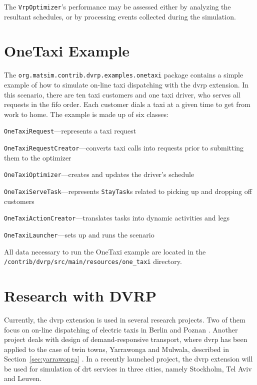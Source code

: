 The \lstinline$VrpOptimizer$'s performance may be assessed either by analyzing the resultant schedules, or by processing events collected during the simulation.

\section{OneTaxi Example}
The \lstinline$org.matsim.contrib.dvrp.examples.onetaxi$ package contains a simple example of how to simulate on-line taxi dispatching with the \gls{dvrp} extension. In this scenario, there are ten taxi customers and one taxi driver, who serves all requests in the \gls{fifo} order. Each customer dials a taxi at a given time to get from work to home. The example is made up of six classes:
%
\begin{compactitem}
	\item \lstinline$OneTaxiRequest$---represents a taxi request	
	\item \lstinline$OneTaxiRequestCreator$---converts taxi calls into requests prior to submitting them to the optimizer
	\item \lstinline$OneTaxiOptimizer$---creates and updates the driver's schedule
	\item \lstinline$OneTaxiServeTask$---represents \lstinline$StayTask$s related to picking up and dropping off customers
	\item \lstinline$OneTaxiActionCreator$---translates tasks into dynamic activities and legs
	\item \lstinline$OneTaxiLauncher$---sets up and runs the scenario
\end{compactitem}
%
All data necessary to run the OneTaxi example are located in the \lstinline$/contrib/dvrp/src/main/resources/one_taxi$ directory.

\section{Research with DVRP}
Currently, the \gls{dvrp} extension is used in several research projects. Two of them focus on on-line dispatching of electric taxis in Berlin and Poznan \citep{MaciejewskiNagel2013TaxiSimulation, MaciejewskiNagel2013OnlineTaxisVSPWP, MaciejewskiNagel2013CooperationTaxiDispatching, Maciejewski2014OnlineViaOffline}. Another project deals with design of demand-responsive transport, where \gls{dvrp} has been applied to the case of twin towns, Yarrawonga and Mulwala, described in Section~\ref{sec:yarrawonga} \citep{RonThoWin2015, ronald14SimulatingDRT}. In a recently launched project, the \gls{dvrp} extension will be used for simulation of \gls{drt} services in three cities, namely Stockholm, Tel Aviv and Leuven.

